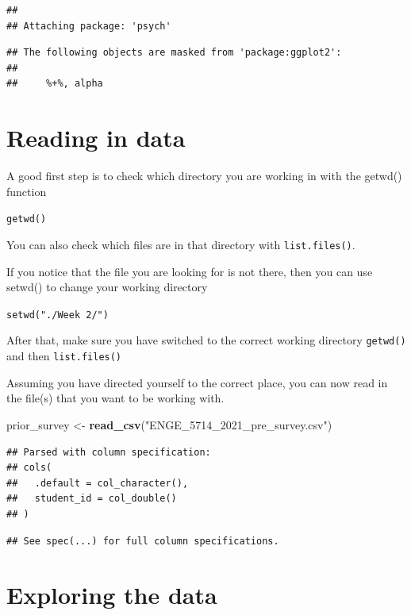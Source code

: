 \documentclass[
]{book}
\newenvironment{Shaded}{\begin{snugshade}}{\end{snugshade}}
\newcommand{\KeywordTok}[1]{\textcolor[rgb]{0.13,0.29,0.53}{\textbf{#1}}}
\newcommand{\NormalTok}[1]{#1}
\newcommand{\StringTok}[1]{\textcolor[rgb]{0.31,0.60,0.02}{#1}}
\begin{document}
\begin{verbatim}
## 
## Attaching package: 'psych'
\end{verbatim}

\begin{verbatim}
## The following objects are masked from 'package:ggplot2':
## 
##     %+%, alpha
\end{verbatim}

\hypertarget{reading-in-data}{%
\section{Reading in data}\label{reading-in-data}}

A good first step is to check which directory you are working in with the getwd() function

\texttt{getwd()}

You can also check which files are in that directory with \texttt{list.files()}.

If you notice that the file you are looking for is not there, then you can use setwd() to change your working directory

\texttt{setwd("./Week\ 2/")}

After that, make sure you have switched to the correct working directory
\texttt{getwd()} and then \texttt{list.files()}

Assuming you have directed yourself to the correct place, you can now read in the file(s) that you want to be working with.

\begin{Shaded}
\begin{Highlighting}[]
\NormalTok{prior\_survey \textless{}{-}}\StringTok{ }\KeywordTok{read\_csv}\NormalTok{(}\StringTok{"ENGE\_5714\_2021\_pre\_survey.csv"}\NormalTok{)}
\end{Highlighting}
\end{Shaded}

\begin{verbatim}
## Parsed with column specification:
## cols(
##   .default = col_character(),
##   student_id = col_double()
## )
\end{verbatim}

\begin{verbatim}
## See spec(...) for full column specifications.
\end{verbatim}

\hypertarget{exploring-the-data}{%
\section{Exploring the data}\label{exploring-the-data}}
\end{document}
